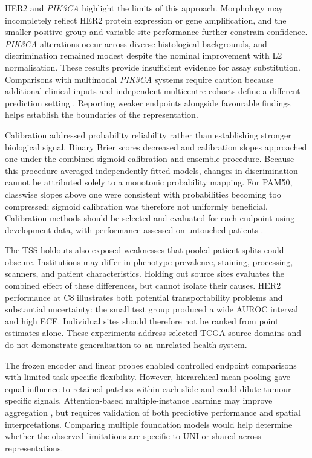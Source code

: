 \documentclass[pdflatex]{cas-dc}
\theoremstyle{remark}
\theoremstyle{plain}
\begin{document}
HER2 and \textit{PIK3CA} highlight the limits of this approach. Morphology may incompletely reflect HER2 protein expression or gene amplification, and the smaller positive group and variable site performance further constrain confidence. \textit{PIK3CA} alterations occur across diverse histological backgrounds, and discrimination remained modest despite the nominal improvement with L2 normalisation. These results provide insufficient evidence for assay substitution. Comparisons with multimodal \textit{PIK3CA} systems require caution because additional clinical inputs and independent multicentre cohorts define a different prediction setting \citep{Miao2026}. Reporting weaker endpoints alongside favourable findings helps establish the boundaries of the representation.

Calibration addressed probability reliability rather than establishing stronger biological signal. Binary Brier scores decreased and calibration slopes approached one under the combined sigmoid-calibration and ensemble procedure. Because this procedure averaged independently fitted models, changes in discrimination cannot be attributed solely to a monotonic probability mapping. For PAM50, classwise slopes above one were consistent with probabilities becoming too compressed; sigmoid calibration was therefore not uniformly beneficial. Calibration methods should be selected and evaluated for each endpoint using development data, with performance assessed on untouched patients \citep{Guo2017,Minderer2021}.

The TSS holdouts also exposed weaknesses that pooled patient splits could obscure. Institutions may differ in phenotype prevalence, staining, processing, scanners, and patient characteristics. Holding out source sites evaluates the combined effect of these differences, but cannot isolate their causes. HER2 performance at C8 illustrates both potential transportability problems and substantial uncertainty: the small test group produced a wide AUROC interval and high ECE. Individual sites should therefore not be ranked from point estimates alone. These experiments address selected TCGA source domains and do not demonstrate generalisation to an unrelated health system.

The frozen encoder and linear probes enabled controlled endpoint comparisons with limited task-specific flexibility. However, hierarchical mean pooling gave equal influence to retained patches within each slide and could dilute tumour-specific signals. Attention-based multiple-instance learning may improve aggregation \citep{Lu2021}, but requires validation of both predictive performance and spatial interpretations. Comparing multiple foundation models would help determine whether the observed limitations are specific to UNI or shared across representations.
\end{document}
